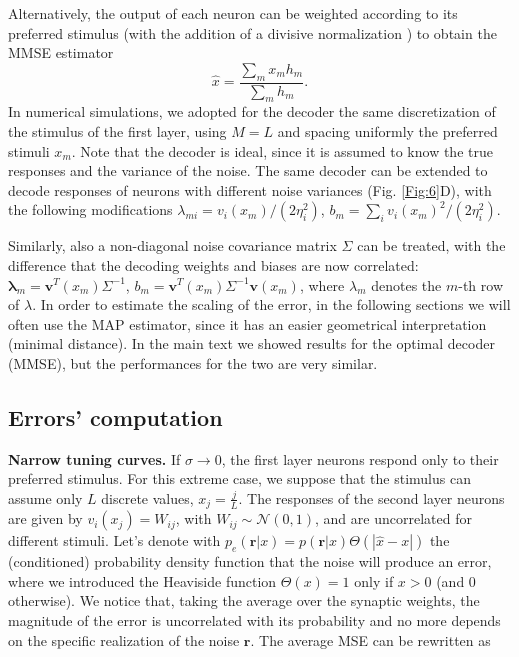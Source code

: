 \documentclass[a4paper]{article}%
\begin{document}
Alternatively, the output of each neuron can be weighted according to its
preferred stimulus (with the addition of a divisive normalization ) to obtain
the MMSE estimator
\begin{equation}
\hat{x} = \frac{\sum_{m} x_{m} h_{m}}{\sum_{m} h_{m}}.\label{Eq:Dec}%
\end{equation}
In numerical simulations, we adopted for the decoder the same discretization
of the stimulus of the first layer, using $M=L$ and spacing uniformly the
preferred stimuli $x_{m}$. Note that the decoder is ideal, since it is assumed
to know the true responses and the variance of the noise. The same decoder can
be extended to decode responses of neurons with different noise variances
(Fig. \ref{Fig:6}D), with the following modifications $\lambda_{mi} =
v_{i}(x_{m})/(2\eta_{i}^{2})$, $b_{m} = \sum_{i} v_{i}(x_{m})^{2}/(2\eta
_{i}^{2})$.

Similarly, also a non-diagonal noise covariance matrix $\Sigma$ can be
treated, with the difference that the decoding weights and biases are now
correlated: $\mathbf{\lambda}_{m} = \mathbf{v}^{T}(x_{m})\Sigma^{-1}$, $b_{m}
= \mathbf{v}^{T}(x_{m})\Sigma^{-1}\mathbf{v}(x_{m})$, where $\lambda_{m}$
denotes the $m$-th row of $\lambda$. In order to estimate the scaling of the
error, in the following sections we will often use the MAP estimator, since it
has an easier geometrical interpretation (minimal distance). In the main text
we showed results for the optimal decoder (MMSE), but the performances for the
two are very similar. \newline\newline

\subsection{Errors' computation}

\textbf{Narrow tuning curves.} If $\sigma\rightarrow0$, the first layer
neurons respond only to their preferred stimulus. For this extreme case, we
suppose that the stimulus can assume only $L$ discrete values, $x_{j} =
\frac{j}{L}$. The responses of the second layer neurons are given by
$v_{i}(x_{j}) = W_{ij}$, with $W_{ij} \sim\mathcal{N}(0,1) $, and are
uncorrelated for different stimuli. Let's denote with $p_{e}(\mathbf{r}|x) =
p(\mathbf{r}|x)\Theta(|\hat{x}-x|)$ the (conditioned) probability density
function that the noise will produce an error, where we introduced the
Heaviside function $\Theta(x) = 1$ only if $x>0$ (and 0 otherwise). We notice
that, taking the average over the synaptic weights, the magnitude of the error
is uncorrelated with its probability and no more depends on the specific
realization of the noise $\mathbf{r}$. The average MSE can be rewritten as%
\end{document}
